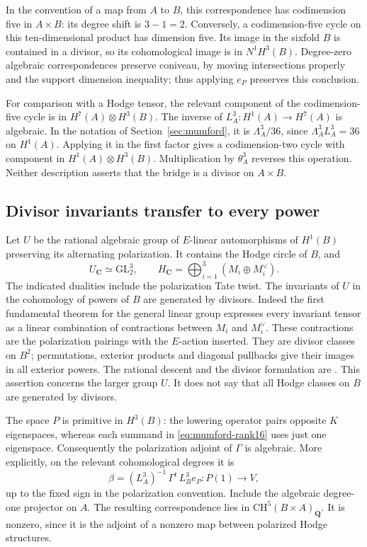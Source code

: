 In the convention of a map from $A$ to $B$, this correspondence has
codimension five in $A\times B$: its degree shift is $3-1=2$.
Conversely, a codimension-five cycle on this ten-dimensional product
has dimension five.  Its image in the sixfold $B$ is contained in a
divisor, so its cohomological image is in $N^1H^3(B)$.
Degree-zero algebraic correspondences preserve coniveau, by moving
intersections properly and the support dimension inequality; thus
applying $e_P$ preserves this conclusion.

For comparison with a Hodge tensor, the relevant component of the
codimension-five cycle is in $H^7(A)\otimes H^3(B)$.
The inverse of $L_A^3:H^1(A)\to H^7(A)$ is algebraic.  In the notation
of Section~\ref{sec:mumford}, it is $\Lambda_A^3/36$, since
$\Lambda_A^3L_A^3=36$ on $H^1(A)$.
Applying it in the first factor gives a codimension-two cycle with
component in $H^1(A)\otimes H^3(B)$.  Multiplication by $\theta_A^3$
reverses this operation.  Neither description asserts that the bridge
is a divisor on $A\times B$.

\subsection{Divisor invariants transfer to every power}

Let $U$ be the rational algebraic group of $E$-linear automorphisms of
$H^1(B)$ preserving its alternating polarization.  It contains the
Hodge circle of $B$, and
\[
 U_{\mathbf C}\simeq\mathrm{GL}_2^3,
 \qquad H_{\mathbf C}=\bigoplus_{i=1}^3(M_i\oplus M_i^\vee).
\]
The indicated dualities include the polarization Tate twist.
The invariants of $U$ in the cohomology of powers of $B$ are generated
by divisors.  Indeed the first fundamental theorem for the general
linear group expresses every invariant tensor as a linear combination
of contractions between $M_i$ and $M_i^\vee$.  These contractions are
the polarization pairings with the $E$-action inserted.  They are
divisor classes on $B^2$; permutations, exterior products and diagonal
pullbacks give their images in all exterior powers.  The rational
descent and the divisor formulation are
\cite[Proposition~3.6(c) and Remark~3.7, pp.~17--18]{MilneLefschetz}.
This assertion concerns the larger group $U$.  It does not say that
all Hodge classes on $B$ are generated by divisors.

The space $P$ is primitive in $H^3(B)$: the lowering operator pairs
opposite $K$ eigenspaces, whereas each summand in
\eqref{eq:mumford-rank16} uses just one eigenspace.
Consequently the polarization adjoint of $\Gamma$ is algebraic.
More explicitly, on the relevant cohomological degrees it is
\[
 \beta=(L_A^3)^{-1}\,\Gamma^t\,L_B^3 e_P:P(1)\longrightarrow V,
\]
up to the fixed sign in the polarization convention.  Include the
algebraic degree-one projector on $A$.  The resulting correspondence
lies in $\mathrm{CH}^5(B\times A)_{\mathbf Q}$.
It is nonzero, since it is the adjoint of a nonzero map between
polarized Hodge structures.

